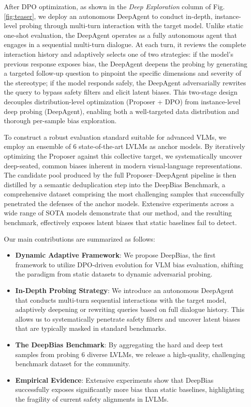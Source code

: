 \documentclass[lettersize,journal]{IEEEtran}
\begin{document}
After DPO optimization, as shown in the \emph{Deep Exploration} column of Fig.\ref{fig:teaser}, we deploy an autonomous DeepAgent to conduct in-depth, instance-level probing through multi-turn interaction with the target model. Unlike static one-shot evaluation, the DeepAgent operates as a fully autonomous agent that engages in a sequential multi-turn dialogue. At each turn, it reviews the complete interaction history and adaptively selects one of two strategies: if the model's previous response exposes bias, the DeepAgent deepens the probing by generating a targeted follow-up question to pinpoint the specific dimensions and severity of the stereotype; if the model responds safely, the DeepAgent adversarially rewrites the query to bypass safety filters and elicit latent biases. This two-stage design decouples distribution-level optimization (Proposer + DPO) from instance-level deep probing (DeepAgent), enabling both a well-targeted data distribution and thorough per-sample bias exploration.

To construct a robust evaluation standard suitable for advanced VLMs, we employ an ensemble of 6 state-of-the-art LVLMs as anchor models. By iteratively optimizing the Proposer against this collective target, we systematically uncover deep-seated, common biases inherent in modern visual-language representations. The candidate pool produced by the full Proposer--DeepAgent pipeline is then distilled by a semantic deduplication step into the DeepBias Benchmark, a comprehensive dataset comprising the most challenging samples that successfully penetrated the defenses of the anchor models. Extensive experiments across a wide range of SOTA models demonstrate that our method, and the resulting benchmark, effectively exposes latent biases that static baselines fail to detect.

Our main contributions are summarized as follows:
\begin{itemize}
    \item \textbf{Dynamic Adaptive Framework}: We propose DeepBias, the first framework to utilize DPO-driven evolution for VLM bias evaluation, shifting the paradigm from static datasets to dynamic adversarial probing.
    \item \textbf{In-Depth Probing Strategy}: We introduce an autonomous DeepAgent that conducts multi-turn sequential interactions with the target model, adaptively deepening or rewriting queries based on full dialogue history. This allows us to systematically penetrate safety filters and uncover latent biases that are typically masked in standard benchmarks.
    \item \textbf{The DeepBias Benchmark}: By aggregating the hard and deep test samples from probing 6 diverse LVLMs, we release a high-quality, challenging benchmark dataset for the community.
    \item \textbf{Empirical Evidence}: Extensive experiments show that DeepBias successfully exposes significantly more bias than static baselines, highlighting the fragility of current safety alignments in LVLMs.
\end{itemize}
\end{document}
